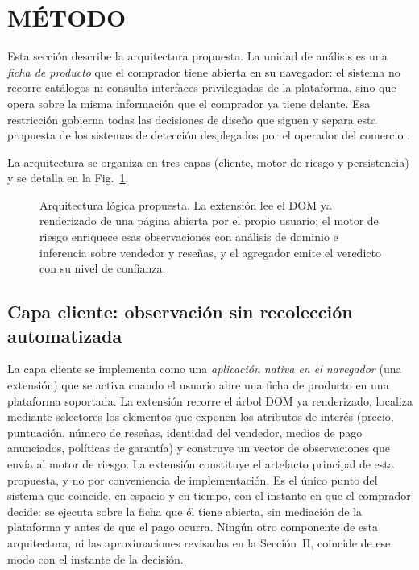 
\section{MÉTODO}

Esta sección describe la arquitectura propuesta. La unidad de análisis es una \emph{ficha de
producto} que el comprador tiene abierta en su navegador: el sistema no recorre catálogos ni
consulta interfaces privilegiadas de la plataforma, sino que opera sobre la misma información
que el comprador ya tiene delante. Esa restricción gobierna todas las decisiones de diseño
que siguen y separa esta propuesta de los sistemas de detección desplegados por el operador
del comercio \cite{ref28}.

La arquitectura se organiza en tres capas (cliente, motor de riesgo y persistencia) y se
detalla en la Fig.~\ref{fig:arquitectura}.

\begin{figure}[t]
\centering
\resizebox{0.95\textwidth}{!}{}
\caption{Arquitectura lógica propuesta. La extensión lee el DOM ya renderizado de una página
abierta por el propio usuario; el motor de riesgo enriquece esas observaciones con análisis de
dominio e inferencia sobre vendedor y reseñas, y el agregador emite el veredicto con su nivel
de confianza.}
\label{fig:arquitectura}
\end{figure}

\subsection{Capa cliente: observación sin recolección automatizada}

La capa cliente se implementa como una \emph{aplicación nativa en el navegador} (una
extensión) que se activa cuando el usuario abre una ficha de producto en una plataforma
soportada. La extensión recorre el árbol DOM ya
renderizado, localiza mediante selectores los elementos que exponen los atributos de interés
(precio, puntuación, número de reseñas, identidad del vendedor, medios de pago anunciados,
políticas de garantía) y construye un vector de observaciones que envía al motor de riesgo.
La extensión constituye el artefacto principal de esta propuesta, y no por conveniencia de
implementación. Es el único punto del sistema que coincide, en espacio y en tiempo, con el
instante en que el comprador decide: se ejecuta sobre la ficha que él tiene abierta, sin
mediación de la plataforma y antes de que el pago ocurra. Ningún otro componente de esta
arquitectura, ni las aproximaciones revisadas en la Sección~II, coincide de ese modo con el
instante de la decisión.

